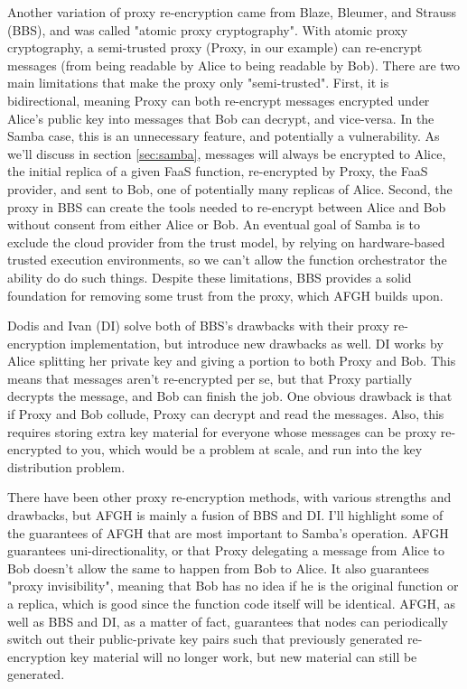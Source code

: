 Another variation of proxy re-encryption came from Blaze, Bleumer, and Strauss (BBS), and was called "atomic proxy cryptography".
\cite{bbs}
\cite{afgh}
With atomic proxy cryptography, a semi-trusted proxy (Proxy, in our example) can re-encrypt messages (from being readable by Alice to being readable by Bob). 
There are two main limitations that make the proxy only "semi-trusted".
First, it is bidirectional, meaning Proxy can both re-encrypt messages encrypted under Alice's public key into messages that Bob can decrypt, and vice-versa.
In the Samba case, this is an unnecessary feature, and potentially a vulnerability.
As we'll discuss in section \ref{sec:samba}, messages will always be encrypted to Alice, the initial replica of a given FaaS function, re-encrypted by Proxy, the FaaS provider, and sent to Bob, one of potentially many replicas of Alice.
Second, the proxy in BBS can create the tools needed to re-encrypt between Alice and Bob without consent from either Alice or Bob.
An eventual goal of Samba is to exclude the cloud provider from the trust model, by relying on hardware-based trusted execution environments, so we can't allow the function orchestrator the ability do do such things.
Despite these limitations, BBS provides a solid foundation for removing some trust from the proxy, which AFGH builds upon.
\cite{afgh}
\cite{bbs}

Dodis and Ivan (DI) solve both of BBS's drawbacks with their proxy re-encryption implementation, but introduce new drawbacks as well.
\cite{afgh}
\cite{ivan_dodis}
DI works by Alice splitting her private key and giving a portion to both Proxy and Bob.
This means that messages aren't re-encrypted per se, but that Proxy partially decrypts the message, and Bob can finish the job.
One obvious drawback is that if Proxy and Bob collude, Proxy can decrypt and read the messages.
Also, this requires storing extra key material for everyone whose messages can be proxy re-encrypted to you, which would be a problem at scale, and run into the key distribution problem.

There have been other proxy re-encryption methods, with various strengths and drawbacks, but AFGH is mainly a fusion of BBS and DI.
\cite{afgh}
\cite{lidong_zhou_distributed_2005}
\cite{markus}
I'll highlight some of the guarantees of AFGH that are most important to Samba's operation.
AFGH guarantees uni-directionality, or that Proxy delegating a message from Alice to Bob doesn't allow the same to happen from Bob to Alice.
It also guarantees "proxy invisibility", meaning that Bob has no idea if he is the original function or a replica, which is good since the function code itself will be identical.
AFGH, as well as BBS and DI, as a matter of fact, guarantees that nodes can periodically switch out their public-private key pairs such that previously generated re-encryption key material will no longer work, but new material can still be generated.


